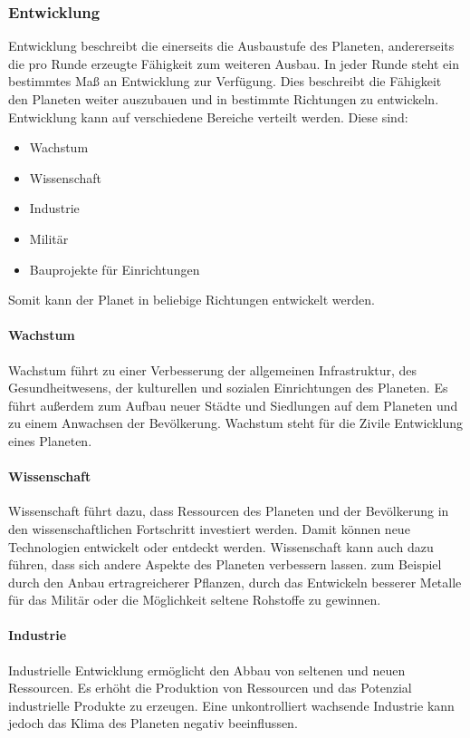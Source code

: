 \documentclass[11pt, a4paper]{article}
\begin{document}
\subsubsection{Entwicklung}
Entwicklung beschreibt die einerseits die Ausbaustufe des Planeten, andererseits die pro Runde erzeugte 
Fähigkeit zum weiteren Ausbau. In jeder Runde steht ein bestimmtes Maß an Entwicklung zur Verfügung. 
Dies beschreibt die Fähigkeit den Planeten weiter auszubauen und in bestimmte Richtungen zu entwickeln.
Entwicklung kann auf verschiedene Bereiche verteilt werden. Diese sind:
\begin{itemize}
    \item Wachstum
    \item Wissenschaft
    \item Industrie
    \item Militär
    \item Bauprojekte für Einrichtungen
\end{itemize}
Somit kann der Planet in beliebige Richtungen entwickelt werden.

\paragraph{Wachstum}
Wachstum führt zu einer Verbesserung der allgemeinen Infrastruktur, des Gesundheitwesens, der kulturellen und sozialen
Einrichtungen des Planeten. Es führt außerdem zum Aufbau neuer Städte und Siedlungen auf dem Planeten und zu einem
Anwachsen der Bevölkerung. Wachstum steht für die Zivile Entwicklung eines Planeten.

\paragraph{Wissenschaft}
Wissenschaft führt dazu, dass Ressourcen des Planeten und der Bevölkerung in den wissenschaftlichen Fortschritt
investiert werden. Damit können neue Technologien entwickelt oder entdeckt werden. Wissenschaft kann auch dazu 
führen, dass sich andere Aspekte des Planeten verbessern lassen. zum Beispiel durch den Anbau ertragreicherer 
Pflanzen, durch das Entwickeln besserer Metalle für das Militär oder die Möglichkeit seltene Rohstoffe zu gewinnen.

\paragraph{Industrie}
Industrielle Entwicklung ermöglicht den Abbau von seltenen und neuen Ressourcen. Es erhöht die Produktion von
Ressourcen und das Potenzial industrielle Produkte zu erzeugen. Eine unkontrolliert wachsende Industrie kann
jedoch das Klima des Planeten negativ beeinflussen.
\end{document}
